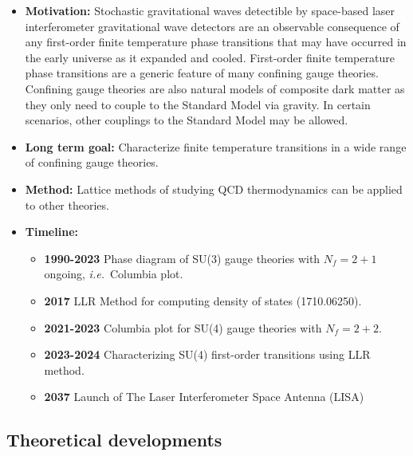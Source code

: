 \documentclass[12pt,hyperpdf]{article}
\begin{document}
\begin{itemize}
   \item { \bf Motivation:} Stochastic gravitational waves detectible by space-based laser interferometer gravitational wave detectors are an observable consequence of any first-order finite temperature phase transitions that may have occurred in the early universe as it expanded and cooled.  First-order finite temperature phase transitions are a generic feature of many confining gauge theories.  Confining gauge theories are also natural models of composite dark matter as they only need to couple to the Standard Model via gravity.  In certain scenarios, other couplings to the Standard Model may be allowed.
   \item { \bf Long term goal:}  Characterize finite temperature transitions in a wide range of confining gauge theories.
   \item {\bf Method:} Lattice methods of studying QCD thermodynamics can be applied to other theories.
\item{\bf Timeline:}
\begin{itemize}
   \item { \bf 1990-2023} Phase diagram of SU(3) gauge theories with $N_f=2+1$ ongoing, \textit{i.e.}\ Columbia plot.
   \item{ \bf 2017} LLR Method for computing density of states (1710.06250).
   \item{ \bf 2021-2023} Columbia plot for SU(4) gauge theories with $N_f=2+2$. 
   \item{ \bf 2023-2024} Characterizing SU(4) first-order transitions using LLR method. 
   \item{ \bf 2037} Launch of The Laser Interferometer Space Antenna (LISA)
\end{itemize}
\end{itemize}


\subsection{Theoretical developments}
\end{document}
